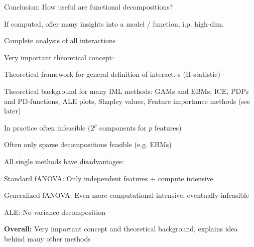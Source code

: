 \documentclass[10pt,compress,t,notes=noshow, xcolor=table]{beamer}
\begin{document}
\begin{framev}[align=top]{Conclusion: How useful are functional decompositions?}
\begin{itemizeM}
\item If computed, offer many insights into a model / function, i.p. high-dim.
\item[$\rightarrow$] Complete analysis of all interactions
\pause
\item Very important theoretical concept:
\begin{itemizeS}
\item Theoretical framework for general definition of interact.-s (H-statistic)
\item Theoretical background for many IML methods:
GAMs and EBMs,
ICE, PDPs and PD-functions,
ALE plots,
Shapley values,
Feature importance methods (see later)
\end{itemizeS}
\pause
\item In practice often infeasible ($2^p$ components for $p$ features)
\item[$\implies$] Often only sparse decompositions feasible (e.g. EBMs)
\pause
\item All single methods have disadvantages:
\begin{itemizeS}
\item Standard fANOVA: Only independent features + compute intensive
\item Generalized fANOVA: Even more computational intensive, eventually infeasible
\item ALE: No variance decomposition
\end{itemizeS}
\end{itemizeM}
\pause
\textbf{Overall:} Very important concept and theoretical background, explains idea behind many other methods
\end{framev}


\endlecture
\end{document}
